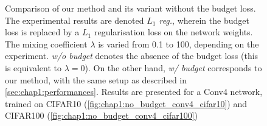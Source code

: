 \begin{figure}
  \centering
    \caption{ Comparison of our method and its variant without the
    budget loss. The experimental results are denoted \emph{$L_1$ reg.}, wherein
    the budget loss is replaced by a $L_1$ regularisation loss on the network
    weights. The mixing coefficient $\lambda$ is varied from 0.1 to 100,
    depending on the experiment. \emph{w/o budget} denotes the absence of the
    budget loss (this is equivalent to $\lambda = 0$). On the other hand,
    \emph{w/ budget} corresponds to our method, with the same setup as described
    in \cref{sec:chap1:performances}. Results are presented for a Conv4 network,
    trained on CIFAR10 (\cref{fig:chap1:no_budget_conv4_cifar10}) and CIFAR100
    (\cref{fig:chap1:no_budget_conv4_cifar100})} 
      \label{fig:chap1:no_budget_conv4}
\end{figure}
  
  

